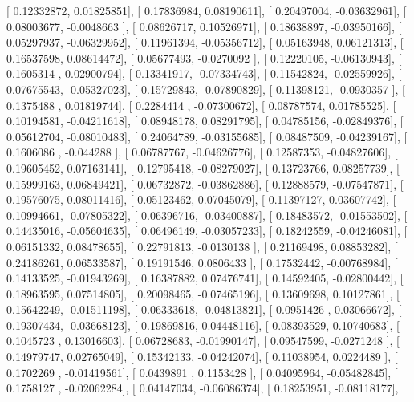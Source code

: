 \documentclass{article}
\begin{document}
       [ 0.12332872,  0.01825851],
       [ 0.17836984,  0.08190611],
       [ 0.20497004, -0.03632961],
       [ 0.08003677, -0.0048663 ],
       [ 0.08626717,  0.10526971],
       [ 0.18638897, -0.03950166],
       [ 0.05297937, -0.06329952],
       [ 0.11961394, -0.05356712],
       [ 0.05163948,  0.06121313],
       [ 0.16537598,  0.08614472],
       [ 0.05677493, -0.0270092 ],
       [ 0.12220105, -0.06130943],
       [ 0.1605314 ,  0.02900794],
       [ 0.13341917, -0.07334743],
       [ 0.11542824, -0.02559926],
       [ 0.07675543, -0.05327023],
       [ 0.15729843, -0.07890829],
       [ 0.11398121, -0.0930357 ],
       [ 0.1375488 ,  0.01819744],
       [ 0.2284414 , -0.07300672],
       [ 0.08787574,  0.01785525],
       [ 0.10194581, -0.04211618],
       [ 0.08948178,  0.08291795],
       [ 0.04785156, -0.02849376],
       [ 0.05612704, -0.08010483],
       [ 0.24064789, -0.03155685],
       [ 0.08487509, -0.04239167],
       [ 0.1606086 , -0.044288  ],
       [ 0.06787767, -0.04626776],
       [ 0.12587353, -0.04827606],
       [ 0.19605452,  0.07163141],
       [ 0.12795418, -0.08279027],
       [ 0.13723766,  0.08257739],
       [ 0.15999163,  0.06849421],
       [ 0.06732872, -0.03862886],
       [ 0.12888579, -0.07547871],
       [ 0.19576075,  0.08011416],
       [ 0.05123462,  0.07045079],
       [ 0.11397127,  0.03607742],
       [ 0.10994661, -0.07805322],
       [ 0.06396716, -0.03400887],
       [ 0.18483572, -0.01553502],
       [ 0.14435016, -0.05604635],
       [ 0.06496149, -0.03057233],
       [ 0.18242559, -0.04246081],
       [ 0.06151332,  0.08478655],
       [ 0.22791813, -0.0130138 ],
       [ 0.21169498,  0.08853282],
       [ 0.24186261,  0.06533587],
       [ 0.19191546,  0.0806433 ],
       [ 0.17532442, -0.00768984],
       [ 0.14133525, -0.01943269],
       [ 0.16387882,  0.07476741],
       [ 0.14592405, -0.02800442],
       [ 0.18963595,  0.07514805],
       [ 0.20098465, -0.07465196],
       [ 0.13609698,  0.10127861],
       [ 0.15642249, -0.01511198],
       [ 0.06333618, -0.04813821],
       [ 0.0951426 ,  0.03066672],
       [ 0.19307434, -0.03668123],
       [ 0.19869816,  0.04448116],
       [ 0.08393529,  0.10740683],
       [ 0.1045723 ,  0.13016603],
       [ 0.06728683, -0.01990147],
       [ 0.09547599, -0.0271248 ],
       [ 0.14979747,  0.02765049],
       [ 0.15342133, -0.04242074],
       [ 0.11038954,  0.0224489 ],
       [ 0.1702269 , -0.01419561],
       [ 0.0439891 ,  0.1153428 ],
       [ 0.04095964, -0.05482845],
       [ 0.1758127 , -0.02062284],
       [ 0.04147034, -0.06086374],
       [ 0.18253951, -0.08118177],
\end{document}
